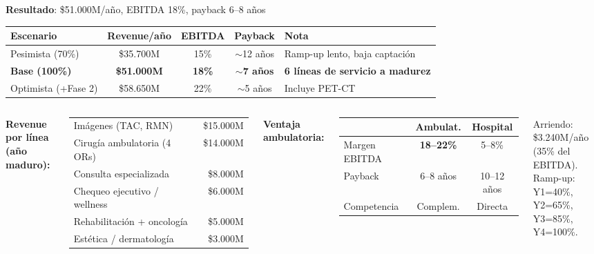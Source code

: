 \documentclass[aspectratio=169, 12pt]{beamer}
\newcommand{\eqvar}[2]{\textcolor{#1}{\textbf{#2}}}
\begin{document}
{
\begin{frame}{\eqvar{resultado}{Resultado}: \$51.000M/año, EBITDA 18\%, payback 6--8 años}

\vspace{4pt}
\begin{center}
{\small
\begin{tabular}{@{}lcccl@{}}
\toprule
\textbf{Escenario} & \textbf{Revenue/año} & \textbf{EBITDA} & \textbf{Payback} & \textbf{Nota} \\
\midrule
\rowcolor{brecha!6}
Pesimista (70\%) & \$35.700M & 15\% & $\sim$12 años & Ramp-up lento, baja captación \\
\rowcolor{resultado!12}
\textbf{Base (100\%)} & \textcolor{resultado}{\textbf{\$51.000M}} & \textcolor{resultado}{\textbf{18\%}} & \textcolor{resultado}{\textbf{$\sim$7 años}} & \textbf{6 líneas de servicio a madurez} \\
\rowcolor{velocidad!6}
Optimista (+Fase 2) & \$58.650M & 22\% & $\sim$5 años & Incluye PET-CT \\
\bottomrule
\end{tabular}
}
\end{center}

\vspace{8pt}
\begin{columns}[T]
{\scriptsize\textbf{Revenue por línea (año maduro):}}

\vspace{2pt}
{\scriptsize
\begin{tabular}{@{}lr@{}}
Imágenes (TAC, RMN) & \$15.000M \\
Cirugía ambulatoria (4 ORs) & \$14.000M \\
Consulta especializada & \$8.000M \\
Chequeo ejecutivo / wellness & \$6.000M \\
Rehabilitación + oncología & \$5.000M \\
Estética / dermatología & \$3.000M \\
\end{tabular}
}

{\scriptsize\textbf{Ventaja ambulatoria:}}

\vspace{2pt}
{\scriptsize
\begin{tabular}{@{}lcc@{}}
& \textbf{Ambulat.} & \textbf{Hospital} \\
\midrule
Margen EBITDA & \textcolor{resultado}{\textbf{18--22\%}} & 5--8\% \\
Payback & 6--8 años & 10--12 años \\
Competencia & Complem. & Directa \\
\end{tabular}

\vspace{4pt}
Arriendo: \$3.240M/año (35\% del EBITDA).\\
Ramp-up: Y1=40\%, Y2=65\%, Y3=85\%, Y4=100\%.
}
\end{columns}
\end{frame}
}
\end{document}
